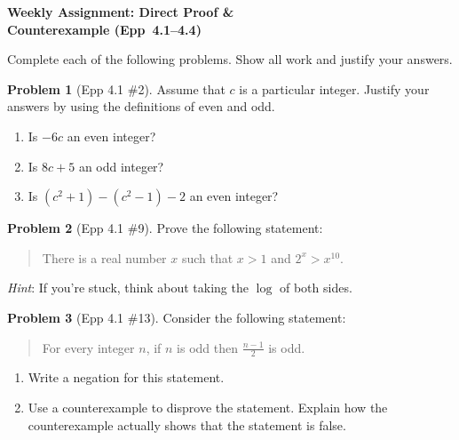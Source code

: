 \documentclass[11pt]{article}
\begin{document}
\begin{center}
  {\Large\bfseries Weekly Assignment: Direct Proof \&\\[2pt]
   Counterexample (Epp~4.1--4.4)}
\end{center}

\bigskip

\noindent
Complete each of the following problems.  Show all work and justify your answers.

\bigskip

\noindent\textbf{Problem 1} (Epp 4.1 \#2). \;
Assume that $c$ is a particular integer.  Justify your answers
by using the definitions of even and odd.

\begin{enumerate}[label=\textbf{\alph*.},itemsep=4pt]
  \item Is $-6c$ an even integer?
  \item Is $8c + 5$ an odd integer?
  \item Is $(c^2 + 1) - (c^2 - 1) - 2$ an even integer?
\end{enumerate}

\bigskip

\noindent\textbf{Problem 2} (Epp 4.1 \#9). \;
Prove the following statement:

\begin{quote}
  There is a real number $x$ such that $x > 1$ and $2^x > x^{10}$.
\end{quote}

\noindent
\emph{Hint}: If you're stuck, think about taking the
$\log$ of both sides.

\bigskip

\noindent\textbf{Problem 3} (Epp 4.1 \#13). \;
Consider the following statement:

\begin{quote}
  For every integer $n$, if $n$ is odd then
  $\displaystyle\frac{n - 1}{2}$ is odd.
\end{quote}

\begin{enumerate}[label=\textbf{(\alph*)},itemsep=4pt]
  \item Write a negation for this statement.
  \item Use a counterexample to disprove the statement.
        Explain how the counterexample actually shows
        that the statement is false.
\end{enumerate}
\end{document}
